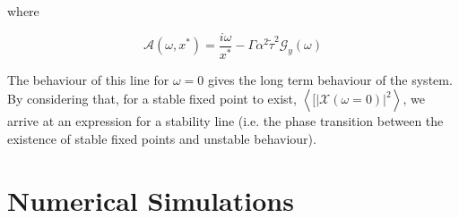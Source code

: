 \documentclass[.../main.tex]{subfiles}
\begin{document}
where

\begin{equation}
	\mathcal{A}(\omega, x^*) = \frac{i \omega}{x^*} - \Gamma \alpha^2 \tilde{\tau}^2 \mathcal{G}_y(\omega)
\end{equation}

The behaviour of this line for $\omega = 0$ gives the long term behaviour of the system. By
considering that, for a stable fixed point to exist, $\left<[|\mathcal{X}(\omega = 0)|^2 \right>$,
we arrive at an expression for a stability line (i.e. the phase transition between the existence of
stable fixed points and unstable behaviour).



\section{Numerical Simulations} %
\label{sec:numerical_simulations}
\end{document}
